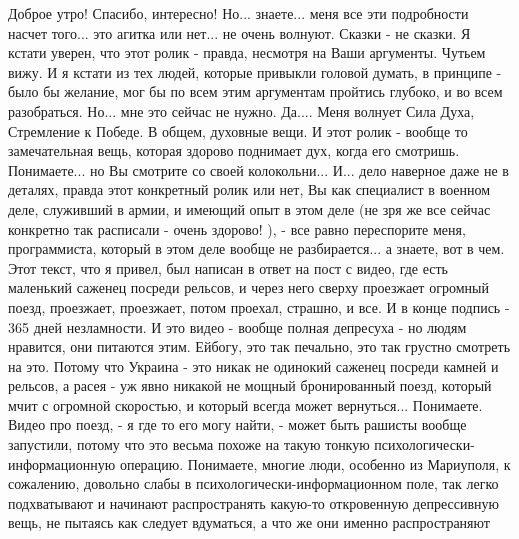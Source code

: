 Доброе утро! Спасибо, интересно! Но... знаете... меня все эти подробности
насчет того... это агитка или нет... не очень волнуют. Сказки - не сказки. Я
кстати уверен, что этот ролик - правда, несмотря на Ваши аргументы. Чутьем
вижу. И я кстати из тех людей, которые привыкли головой думать, в принципе -
было бы желание, мог бы по всем этим аргументам пройтись глубоко, и во всем
разобраться. Но... мне это сейчас не нужно. Да.... Меня волнует Сила Духа,
Стремление к Победе. В общем, духовные вещи. И этот ролик - вообще то
замечательная вещь, которая здорово поднимает дух, когда его смотришь.
Понимаете... но Вы смотрите со своей колокольни... И... дело наверное даже не в
деталях, правда этот конкретный ролик или нет, Вы как специалист в военном
деле, служивший в армии, и имеющий опыт в этом деле (не зря же все сейчас
конкретно так расписали - очень здорово! ), - все равно переспорите меня,
программиста, который в этом деле вообще не разбирается... а знаете, вот в чем.
Этот текст, что я привел, был написан в ответ на пост с видео, где есть
маленький саженец посреди рельсов, и через него сверху проезжает огромный
поезд, проезжает, проезжает, потом проехал, страшно, и все. И в конце подпись -
365 дней незламности. И это видео - вообще полная депресуха - но людям
нравится, они питаются этим. Ейбогу, это так печально, это так грустно смотреть
на это. Потому что Украина - это никак не одинокий саженец посреди камней и
рельсов, а расея - уж явно никакой не мощный бронированный поезд, который мчит
с огромной скоростью, и который всегда может вернуться... Понимаете. Видео про
поезд, - я где то его могу найти, - может быть рашисты вообще запустили, потому
что это весьма похоже на такую тонкую психологически-информационную операцию.
Понимаете, многие люди, особенно из Мариуполя, к сожалению, довольно слабы в
психологически-информационном поле, так легко подхватывают и начинают
распространять какую-то откровенную депрессивную вещь, не пытаясь как следует
вдуматься, а что же они именно распространяют


